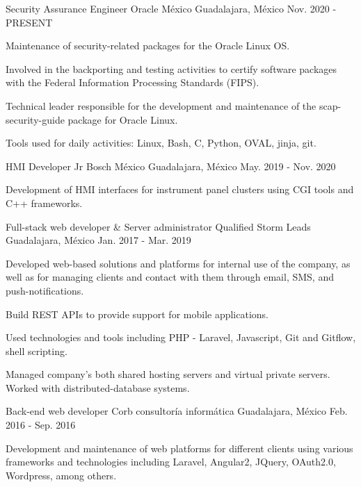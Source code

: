\begin{cventries}
    \cventry
        {Security Assurance Engineer}
        {Oracle México}
        {Guadalajara, México}
        {Nov. 2020 - PRESENT}
        {
            \begin{cvitems}
                \item {Maintenance of security-related packages for the Oracle Linux OS.}
                \item {Involved in the backporting and testing activities to certify software packages with the Federal Information Processing Standards (FIPS).}
                \item {Technical leader responsible for the development and maintenance of the scap-security-guide package for Oracle Linux.}
                \item {Tools used for daily activities: Linux, Bash, C, Python, OVAL, jinja, git.}
            \end{cvitems}
        }
    \cventry
        {HMI Developer Jr}
        {Bosch México}
        {Guadalajara, México}
        {May. 2019 - Nov. 2020}
        {
            \begin{cvitems}
                \item {Development of HMI interfaces for instrument panel clusters using CGI tools and C++ frameworks.}
            \end{cvitems}
        }
    \cventry
        {Full-stack web developer \& Server administrator}
        {Qualified Storm Leads}
        {Guadalajara, México}
        {Jan. 2017 - Mar. 2019}
        {
            \begin{cvitems}
                \item {Developed web-based solutions and platforms for internal use of the company, as well as for managing clients and contact with them through email, SMS, and push-notifications.}
                \item {Build REST APIs to provide support for mobile applications.}
                \item {Used technologies and tools including PHP - Laravel, Javascript, Git and Gitflow, shell scripting.}
                \item {Managed company's both shared hosting servers and virtual private servers. Worked with distributed-database systems.}
            \end{cvitems}
        }
    \cventry
        {Back-end web developer}
        {Corb consultoría informática}
        {Guadalajara, México}
        {Feb. 2016 - Sep. 2016}
        {
            \begin{cvitems}
                \item {Development and maintenance of web platforms for different clients using various frameworks and technologies including Laravel, Angular2, JQuery, OAuth2.0, Wordpress, among others.}
            \end{cvitems}
        }
\end{cventries}
